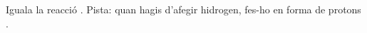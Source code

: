 \begin{exr}{}
Iguala la reacció . Pista: quan hagis d'afegir hidrogen, fes-ho en forma de protons .
\end{exr}
